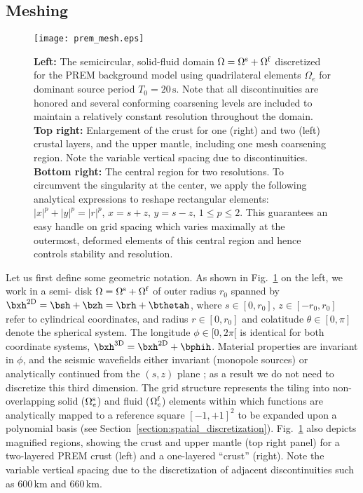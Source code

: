 \subsection{Meshing}
\begin{figure*}[htb!]
\begin{center}
\texttt{[image: prem\_mesh.eps]}
\caption{\textbf{Left:} The semicircular, solid-fluid 
domain $\Omega=\Omega^{\rm s} + \Omega^{\rm f}$
discretized for the PREM background model using
quadrilateral elements $\Omega_e$ for dominant source period $T_0=20\, \textrm{s}$.
Note that all discontinuities are honored and several 
conforming coarsening levels are included to maintain a relatively 
constant resolution throughout the domain. 
\textbf{Top right:} Enlargement of the crust for one (right) and two (left) crustal
layers, and the upper mantle, including one mesh coarsening region. 
Note the variable vertical spacing due to discontinuities.
\textbf{Bottom right:} The central region for two resolutions. 
To circumvent the singularity at the center, 
we apply the following analytical expressions to reshape rectangular elements: 
$\left|{x}\right|^p+\left|{y}\right|^p=\left|{r}\right|^p$, 
$x=s+z,\,y=s-z,\,1\le p \le 2$.
This guarantees an easy handle on grid spacing which varies maximally 
at the outermost, deformed elements of this central region and hence 
controls stability and resolution.}
\label{img:prem_mesh}
\end{center}
\end{figure*}

Let us first define some geometric notation. As shown in 
Fig.~\ref{img:prem_mesh} on the left, we work in a semi- disk 
$\Omega=\Omega^{\rm s} + \Omega^{\rm f}$ of outer 
radius $r_0$ spanned by $\bxh^{\rm 2D}=\bsh + \bzh=\brh+\bthetah$,
where $s\in [0,r_0]$, $z\in [-r_0,r_0]$ refer to cylindrical coordinates, and
radius $r\in [0,r_0]$ and colatitude $\theta\in [0,\pi]$ denote the spherical system. 
The longitude $\phi\in [0,2\pi[$ is identical for both coordinate systems, 
$\bxh^{\rm 3D}=\bxh^{\rm 2D}+\bphih$.  Material properties are invariant in 
$\phi$, and the seismic wavefields either invariant (monopole sources) or analytically 
continued from the $(s,z)$ plane \citep{nissen+:07a}; as a result we do not need 
to discretize this third dimension. The grid structure represents the tiling into
non-overlapping solid ($\Omega_e^{\rm s}$) and fluid ($\Omega_e^{\rm f}$) 
elements within which functions are analytically mapped to a reference square
$[-1,+1]^2$ to be expanded upon a polynomial basis 
(see Section~\ref{section:spatial_discretization}).
Fig.~\ref{img:prem_mesh} also depicts magnified regions, showing 
the crust and upper mantle (top right panel) for a two-layered PREM \citep{prem}
crust (left) and a one-layered ``crust'' (right). Note the variable vertical spacing due to the 
discretization of adjacent discontinuities such as $600\,\textrm{km}$ and 
$660\, \textrm{km}$. 

